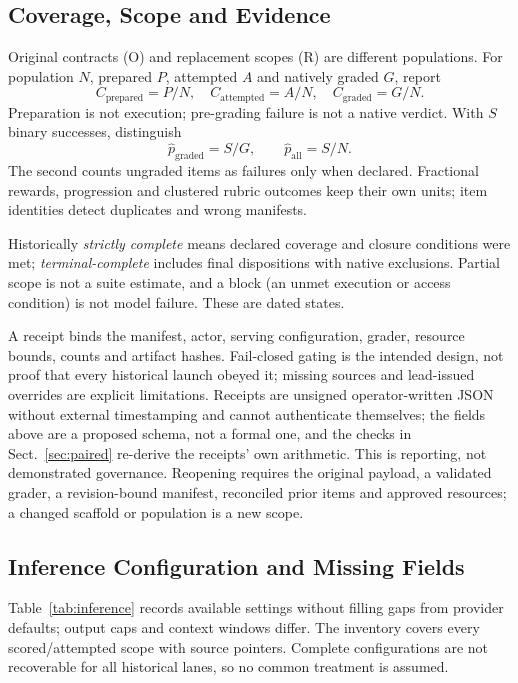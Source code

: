 \documentclass[a4paper,runningheads]{llncs}
\begin{document}
\subsection{Coverage, Scope and Evidence}
Original contracts (O) and replacement scopes (R) are different populations.
For population $N$, prepared $P$, attempted $A$ and natively graded $G$, report
\begin{equation}
C_{\mathrm{prepared}}=P/N,\quad C_{\mathrm{attempted}}=A/N,\quad
C_{\mathrm{graded}}=G/N.
\end{equation}
Preparation is not execution; pre-grading failure is not a native verdict.
With $S$ binary successes, distinguish
\begin{equation}
\widehat p_{\mathrm{graded}}=S/G,\qquad \widehat p_{\mathrm{all}}=S/N.
\end{equation}
The second counts ungraded items as failures only when declared. Fractional
rewards, progression and clustered rubric outcomes keep their own units; item
identities detect duplicates and wrong manifests.

Historically \emph{strictly complete} means declared coverage and closure
conditions were met; \emph{terminal-complete} includes final dispositions with
native exclusions. Partial scope is not a suite estimate, and a block (an unmet
execution or access condition) is not model failure. These are dated states.

A receipt binds the manifest, actor, serving configuration, grader, resource
bounds, counts and artifact hashes. Fail-closed gating is the intended design,
not proof that every historical launch obeyed it; missing sources and
lead-issued overrides are explicit limitations. Receipts are unsigned
operator-written JSON without external timestamping and cannot authenticate
themselves; the fields above are a proposed schema, not a formal one, and the
checks in Sect.~\ref{sec:paired} re-derive the receipts' own arithmetic. This
is reporting, not demonstrated governance. Reopening requires the original
payload, a validated grader, a revision-bound manifest, reconciled prior items
and approved resources; a changed scaffold or population is a new scope.

\subsection{Inference Configuration and Missing Fields}
Table~\ref{tab:inference} records available settings without filling gaps from
provider defaults; output caps and context windows differ. The
inventory covers every scored/attempted scope with source
pointers. Complete configurations are not recoverable for all historical lanes, so
no common treatment is assumed.
\end{document}
